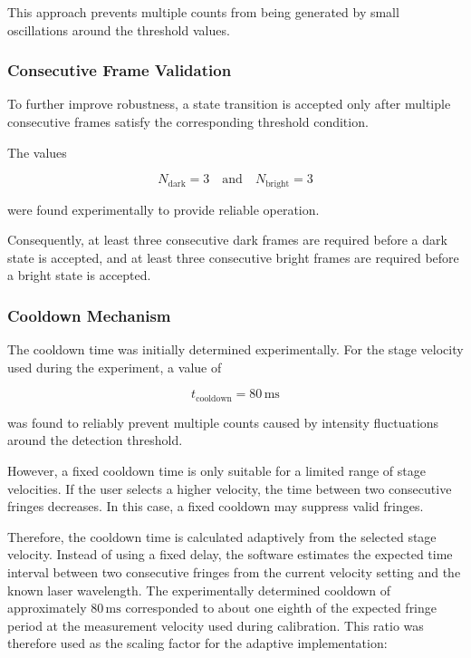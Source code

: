 This approach prevents multiple counts from being generated by small oscillations around the threshold values.

\subsubsection{Consecutive Frame Validation}

To further improve robustness, a state transition is accepted only after multiple consecutive frames satisfy the corresponding threshold condition.

The values

\begin{equation}
N_{\mathrm{dark}} = 3
\quad\text{and}\quad
N_{\mathrm{bright}} = 3
\end{equation}

were found experimentally to provide reliable operation.

Consequently, at least three consecutive dark frames are required before a dark state is accepted, and at least three consecutive bright frames are required before a bright state is accepted.

\subsubsection{Cooldown Mechanism}

The cooldown time was initially determined experimentally. For the stage velocity used during the experiment, a value of

\begin{equation}
t_{\text{cooldown}} = 80\,\mathrm{ms}
\end{equation}

was found to reliably prevent multiple counts caused by intensity fluctuations around the detection threshold.

However, a fixed cooldown time is only suitable for a limited range of stage velocities. If the user selects a higher velocity, the time between two consecutive fringes decreases. In this case, a fixed cooldown may suppress valid fringes.

Therefore, the cooldown time is calculated adaptively from the selected stage velocity. Instead of using a fixed delay, the software estimates the expected time interval between two consecutive fringes from the current velocity setting and the known laser wavelength. The experimentally determined cooldown of approximately \(80\,\mathrm{ms}\) corresponded to about one eighth of the expected fringe period at the measurement velocity used during calibration. This ratio was therefore used as the scaling factor for the adaptive implementation:


